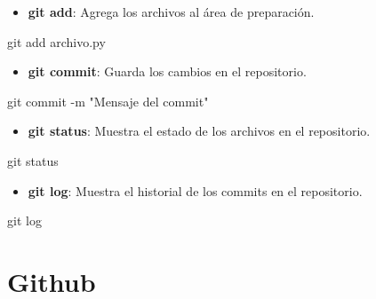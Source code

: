\documentclass[
  a4paper,
  DIV=11,
  numbers=noendperiod,
  onepage,
  openany]{scrreprt}
\newenvironment{Shaded}{\begin{snugshade}}{\end{snugshade}}
\newcommand{\AttributeTok}[1]{\textcolor[rgb]{0.40,0.45,0.13}{#1}}
\newcommand{\FunctionTok}[1]{\textcolor[rgb]{0.28,0.35,0.67}{#1}}
\newcommand{\NormalTok}[1]{\textcolor[rgb]{0.00,0.23,0.31}{#1}}
\newcommand{\StringTok}[1]{\textcolor[rgb]{0.13,0.47,0.30}{#1}}
\providecommand{\tightlist}{%
  \setlength{\itemsep}{0pt}\setlength{\parskip}{0pt}}\usepackage{longtable,booktabs,array}
\begin{document}
\begin{itemize}
\tightlist
\item
  \textbf{git add}: Agrega los archivos al área de preparación.
\end{itemize}

\begin{Shaded}
\begin{Highlighting}[]
\FunctionTok{git}\NormalTok{ add archivo.py}
\end{Highlighting}
\end{Shaded}

\begin{itemize}
\tightlist
\item
  \textbf{git commit}: Guarda los cambios en el repositorio.
\end{itemize}

\begin{Shaded}
\begin{Highlighting}[]
\FunctionTok{git}\NormalTok{ commit }\AttributeTok{{-}m} \StringTok{"Mensaje del commit"}
\end{Highlighting}
\end{Shaded}

\begin{itemize}
\tightlist
\item
  \textbf{git status}: Muestra el estado de los archivos en el
  repositorio.
\end{itemize}

\begin{Shaded}
\begin{Highlighting}[]
\FunctionTok{git}\NormalTok{ status}
\end{Highlighting}
\end{Shaded}

\begin{itemize}
\tightlist
\item
  \textbf{git log}: Muestra el historial de los commits en el
  repositorio.
\end{itemize}

\begin{Shaded}
\begin{Highlighting}[]
\FunctionTok{git}\NormalTok{ log}
\end{Highlighting}
\end{Shaded}

\section{Github}\label{github}
\end{document}
